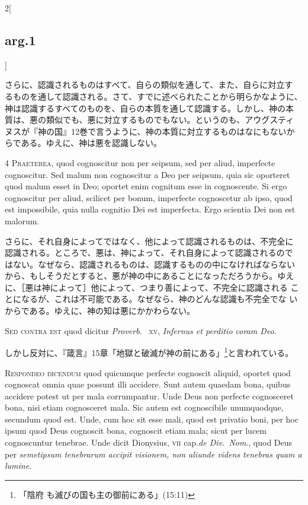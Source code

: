 \documentclass[paper=a4paper,fontsize=10pt,jafontsize=9pt,titlepage]{jlreq}
\begin{document}
\begin{paracol}{2}[\subsection{arg.1}]
\switchcolumn

さらに、認識されるものはすべて、自らの類似を通して、また、自らに対立す
るものを通して認識される。さて、すでに述べられたことから明らかなように、
神は認識するすべてのものを、自らの本質を通して認識する。しかし、神の本
質は、悪の類似でも、悪に対立するものでもない。というのも、アウグスティ
ヌスが『神の国』12巻で言うように、神の本質に対立するものはなにもないか
らである。ゆえに、神は悪を認識しない。


{\scshape 4 Praeterea}, quod cognoscitur non per seipsum, sed per
aliud, imperfecte cognoscitur. Sed malum non cognoscitur a Deo per
seipsum, quia sic oporteret quod malum esset in Deo; oportet enim
cognitum esse in cognoscente. Si ergo cognoscitur per aliud, scilicet
per bonum, imperfecte cognoscetur ab ipso, quod est impossibile, quia
nulla cognitio Dei est imperfecta. Ergo scientia Dei non est malorum.

\switchcolumn

さらに、それ自身によってではなく、他によって認識されるものは、不完全に
認識される。ところで、悪は、神によって、それ自身によって認識されるので
はない。なぜなら、認識されるものは、認識するものの中になければならない
から、もしそうだとすると、悪が神の中にあることになっただろうから。ゆえ
に、［悪は神によって］他によって、つまり善によって、不完全に認識される
ことになるが、これは不可能である。なぜなら、神のどんな認識も不完全でな
いからである。ゆえに、神の知は悪にかかわらない。

\switchcolumn*[\subsection{s.c.}]

{\scshape Sed contra est} quod dicitur {\itshape Proverb}.~{\scshape
xv}, {\itshape Infernus et perditio coram Deo}.

\switchcolumn

しかし反対に、『箴言』15章「地獄と破滅が神の前にある」\footnote{「陰府
も滅びの国も主の御前にある」(15:11)}と言われている。


{\scshape Respondeo dicendum} quod quicumque perfecte cognoscit
aliquid, oportet quod cognoscat omnia quae possunt illi accidere. Sunt
autem quaedam bona, quibus accidere potest ut per mala
corrumpantur. Unde Deus non perfecte cognosceret bona, nisi etiam
cognosceret mala. Sic autem est cognoscibile unumquodque, secundum
quod est. Unde, cum hoc sit esse mali, quod est privatio boni, per hoc
ipsum quod Deus cognoscit bona, cognoscit etiam mala; sicut per lucem
cognoscuntur tenebrae. Unde dicit Dionysius, {\scshape vii}
cap.{\itshape de Div.~Nom}., quod Deus per {\itshape semetipsum
tenebrarum accipit visionem, non aliunde videns tenebras quam a
lumine}.


\end{paracol}
\end{document}
